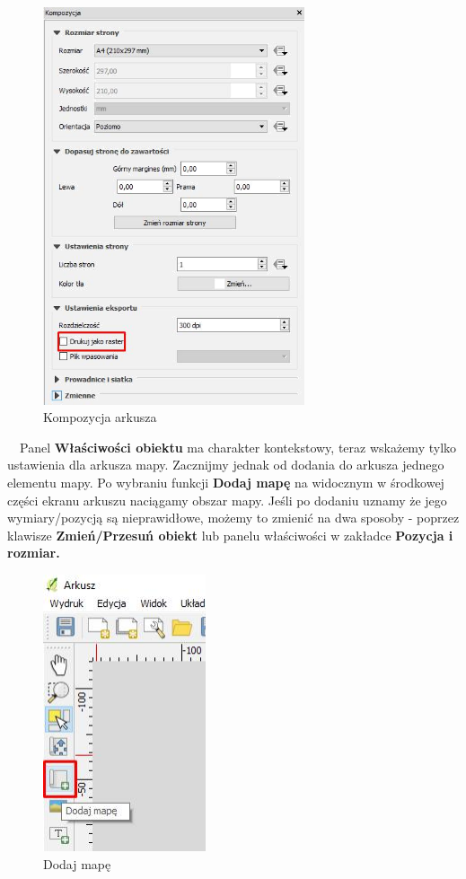 \documentclass[12pt,a4paper]{book}
\begin{document}
\begin{center}
\begin{figure}
\includegraphics[width=7.698cm,height=11.712cm]{008-arkusz.png}
\caption{Kompozycja arkusza}
\end{figure}
\end{center}
\ \ Panel \textbf{Właściwości obiektu }ma charakter kontekstowy, teraz wskażemy tylko ustawienia dla arkusza mapy. Zacznijmy jednak od dodania do arkusza jednego elementu mapy. Po wybraniu funkcji \textbf{Dodaj mapę }na widocznym w środkowej części ekranu arkuszu {\textquotedbl}naciągamy{\textquotedbl} obszar mapy. Jeśli po dodaniu uznamy że jego wymiary/pozycją są nieprawidłowe, możemy to zmienić na dwa sposoby - poprzez klawisze \textbf{Zmień/Przesuń obiekt }lub panelu właściwości w zakładce \textbf{Pozycja i rozmiar.}



\begin{center}
\begin{figure}
\includegraphics[width=4.791cm,height=8.149cm]{008-dodaj-mape.jpg}
\caption{Dodaj mapę}
\end{figure}
\end{center}
\end{document}
